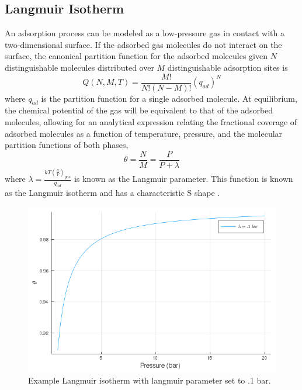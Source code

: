\documentclass{article}
\begin{document}
\subsection{Langmuir Isotherm}
An adsorption process can be modeled as a low-pressure gas in contact with a two-dimensional surface. If the adsorbed gas molecules do not interact on the surface, the canonical partition function for the adsorbed molecules given $N$ distinguishable molecules distributed over $M$ distinguishable adsorption sites is
\begin{equation}
    Q(N, M, T) = \frac{M!}{N!(N-M)!}\left(q_\textit{ad}\right)^N
\end{equation}
where $q_\textit{ad}$ is the partition function for a single adsorbed molecule.
At equilibrium, the chemical potential of the gas will be equivalent to that of the adsorbed molecules, allowing for an analytical expression relating the fractional coverage of adsorbed molecules as a function of temperature, pressure, and the molecular partition functions of both phases,
\begin{equation}
    \theta = \frac{N}{M} = \frac{P}{P + \lambda}
    \label{eq:langmuir}
\end{equation}
where $\lambda = \frac{kT\left(\frac{q}{V}\right)_\textit{gas}}{q_\textit{ad}}$ is known as the Langmuir parameter.
This function is known as the Langmuir isotherm and has a characteristic S shape \cite{iast}.
\begin{figure}[H]
    \centering
    \includegraphics[width=\textwidth]{fig/langmuir.png}
    \caption{Example Langmuir isotherm with langmuir parameter set to .1 bar.}
    \label{fig:langmuir-isotherm}
\end{figure}
\end{document}
